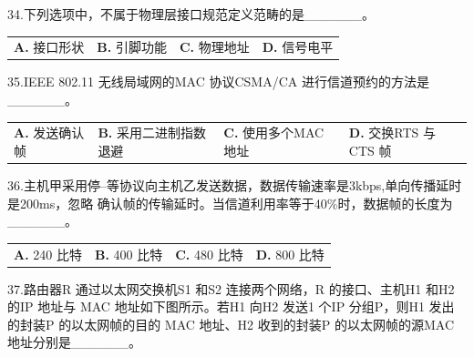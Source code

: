\documentclass[UTF8,11pt]{ctexart}
\begin{document}
34.下列选项中，不属于物理层接口规范定义范畴的是\_\_\_\_\_\_。


\begin{center}\begin{tabular}{>{\raggedright\arraybackslash}p{\dimexpr(\linewidth-8\tabcolsep)/4\relax}>{\raggedright\arraybackslash}p{\dimexpr(\linewidth-8\tabcolsep)/4\relax}>{\raggedright\arraybackslash}p{\dimexpr(\linewidth-8\tabcolsep)/4\relax}>{\raggedright\arraybackslash}p{\dimexpr(\linewidth-8\tabcolsep)/4\relax}}
\textbf{A.} 接口形状 & \textbf{B.} 引脚功能 & \textbf{C.} 物理地址 & \textbf{D.} 信号电平\\[.35em]\end{tabular}\end{center}

35.IEEE 802.11 无线局域网的MAC 协议CSMA/CA 进行信道预约的方法是\_\_\_\_\_\_。


\begin{center}\begin{tabular}{>{\raggedright\arraybackslash}p{\dimexpr(\linewidth-8\tabcolsep)/4\relax}>{\raggedright\arraybackslash}p{\dimexpr(\linewidth-8\tabcolsep)/4\relax}>{\raggedright\arraybackslash}p{\dimexpr(\linewidth-8\tabcolsep)/4\relax}>{\raggedright\arraybackslash}p{\dimexpr(\linewidth-8\tabcolsep)/4\relax}}
\textbf{A.} 发送确认帧 & \textbf{B.} 采用二进制指数退避 & \textbf{C.} 使用多个MAC 地址 & \textbf{D.} 交换RTS 与CTS 帧\\[.35em]\end{tabular}\end{center}

36.主机甲采用停–等协议向主机乙发送数据，数据传输速率是3kbps,单向传播延时是200ms，忽略 确认帧的传输延时。当信道利用率等于40\%时，数据帧的长度为\_\_\_\_\_\_。


\begin{center}\begin{tabular}{>{\raggedright\arraybackslash}p{\dimexpr(\linewidth-8\tabcolsep)/4\relax}>{\raggedright\arraybackslash}p{\dimexpr(\linewidth-8\tabcolsep)/4\relax}>{\raggedright\arraybackslash}p{\dimexpr(\linewidth-8\tabcolsep)/4\relax}>{\raggedright\arraybackslash}p{\dimexpr(\linewidth-8\tabcolsep)/4\relax}}
\textbf{A.} 240 比特 & \textbf{B.} 400 比特 & \textbf{C.} 480 比特 & \textbf{D.} 800 比特\\[.35em]\end{tabular}\end{center}

37.路由器R 通过以太网交换机S1 和S2 连接两个网络，R 的接口、主机H1 和H2 的IP 地址与 MAC 地址如下图所示。若H1 向H2 发送1 个IP 分组P，则H1 发出的封装P 的以太网帧的目的 MAC 地址、H2 收到的封装P 的以太网帧的源MAC 地址分别是\_\_\_\_\_\_。
\end{document}
